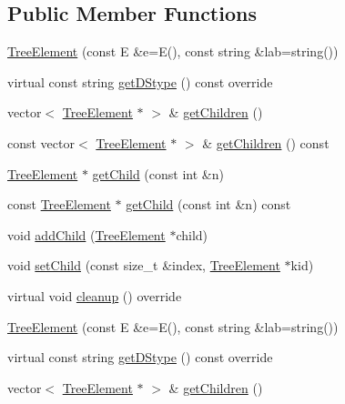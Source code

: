 \subsection*{Public Member Functions}
\begin{DoxyCompactItemize}
\item 
\hyperlink{classbridges_1_1_tree_element_a4e96ffab9a6c711ead687dd8a42e80a0}{Tree\+Element} (const E \&e=E(), const string \&lab=string())
\item 
virtual const string \hyperlink{classbridges_1_1_tree_element_a2990457495ddecc77fa1dda4f47f3010}{get\+D\+Stype} () const  override
\item 
vector$<$ \hyperlink{classbridges_1_1_tree_element}{Tree\+Element} $\ast$ $>$ \& \hyperlink{classbridges_1_1_tree_element_a52cb83546da21674d306cbb8026f89ac}{get\+Children} ()
\item 
const vector$<$ \hyperlink{classbridges_1_1_tree_element}{Tree\+Element} $\ast$ $>$ \& \hyperlink{classbridges_1_1_tree_element_af3d737b2b29a95e5fb654b46bd74206e}{get\+Children} () const 
\item 
\hyperlink{classbridges_1_1_tree_element}{Tree\+Element} $\ast$ \hyperlink{classbridges_1_1_tree_element_a14ce2d5b3a4df29c93a0c37dbe73f7a5}{get\+Child} (const int \&n)
\item 
const \hyperlink{classbridges_1_1_tree_element}{Tree\+Element} $\ast$ \hyperlink{classbridges_1_1_tree_element_a26c8fb95c8c10ded320f81c64ac0e874}{get\+Child} (const int \&n) const 
\item 
void \hyperlink{classbridges_1_1_tree_element_a5e252fa16df0e673526ba4b08c8d3203}{add\+Child} (\hyperlink{classbridges_1_1_tree_element}{Tree\+Element} $\ast$child)
\item 
void \hyperlink{classbridges_1_1_tree_element_aa12cb7cb4b4f559bdf0967872b0a6e7d}{set\+Child} (const size\+\_\+t \&index, \hyperlink{classbridges_1_1_tree_element}{Tree\+Element} $\ast$kid)
\item 
virtual void \hyperlink{classbridges_1_1_tree_element_aad832c9f8dfd7e92c7b06a825f406e1d}{cleanup} () override
\item 
\hyperlink{classbridges_1_1_tree_element_a4e96ffab9a6c711ead687dd8a42e80a0}{Tree\+Element} (const E \&e=E(), const string \&lab=string())
\item 
virtual const string \hyperlink{classbridges_1_1_tree_element_a2990457495ddecc77fa1dda4f47f3010}{get\+D\+Stype} () const  override
\item 
vector$<$ \hyperlink{classbridges_1_1_tree_element}{Tree\+Element} $\ast$ $>$ \& \hyperlink{classbridges_1_1_tree_element_a52cb83546da21674d306cbb8026f89ac}{get\+Children} ()

\end{DoxyCompactItemize}
